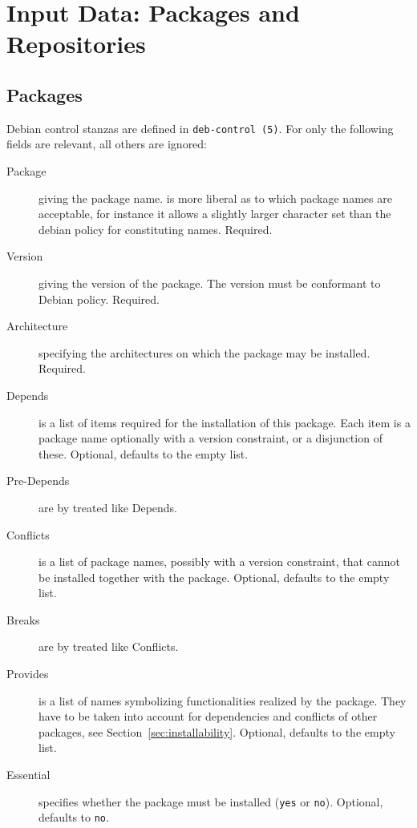 
\section{Input Data: Packages and Repositories}
\label{sec:data}
\subsection{Packages}
\label{sec:packages}
Debian control stanzas are defined in \texttt{deb-control~(5)}. For
\debcheck{} only the following fields are relevant, all others are
ignored:
\begin{description}
\item[Package] giving the package name. \debcheck{} is more liberal as
  to which package names are acceptable, for instance it allows a
  slightly larger character set than the debian policy for
  constituting names. Required.
\item[Version] giving the version of the package. The version must be
  conformant to Debian policy. Required.
\item[Architecture] specifying the architectures on which the package
  may be installed. Required.
\item[Depends] is a list of items required for the installation of
  this package. Each item is a package name optionally with a version
  constraint, or a disjunction of these. Optional, defaults to the
  empty list.
\item[Pre-Depends] are by \debcheck{} treated like Depends.
\item[Conflicts] is a list of package names, possibly with a version
  constraint, that cannot be installed together with the package. Optional,
  defaults to the empty list.
\item[Breaks] are by \debcheck{} treated like Conflicts.
\item[Provides] is a list of names symbolizing functionalities
  realized by the package. They have to be taken into account for
  dependencies and conflicts of other packages, see
  Section~\ref{sec:installability}. Optional, defaults to the empty
  list.
\item[Essential] specifies whether the package must be installed
  (\texttt{yes} or \texttt{no}). Optional, defaults to \texttt{no}.
\end{description}

